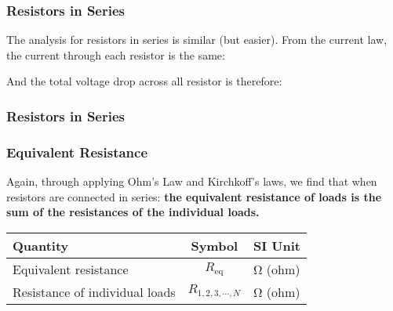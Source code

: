\documentclass[12pt,aspectratio=169]{beamer}
\newcommand{\eq}[2]{\vspace{#1}{\Large\begin{displaymath}#2\end{displaymath}}}
\begin{document}
\begin{frame}
  \frametitle{Resistors in Series}
  \begin{center}
  \end{center}

  \vspace{.1in}The analysis for resistors in series is similar (but easier).
  From the current law, the current through each resistor is the same:

  \eq{-.2in}{I_1=I_2=I_3=\cdots=I}

  \vspace{-.15in}And the total voltage drop across all resistor is therefore:

  \eq{-.4in}{V=V_1+V_2+V_3+\cdot=I(R_1+R_2+R_3+\cdots)}
\end{frame}

\begin{frame}
  \frametitle{Resistors in Series}
  \frametitle{Equivalent Resistance}
  Again, through applying Ohm's Law and Kirchkoff's laws, we find that when
  resistors are connected in series: \textbf{the equivalent resistance of loads
    is the sum of the resistances of the individual loads.}

  \eq{-.2in}{
    \boxed{R_\mathrm{eq}=R_1 + R_2 + \cdots + R_N}
  }
  \begin{center}
    \begin{tabular}{l|c|l}
      \rowcolor{pink}
      \textbf{Quantity} & \textbf{Symbol} & \textbf{SI Unit} \\ \hline
      Equivalent resistance          & $R_\mathrm{eq}$ & \si{\ohm} (ohm) \\
      Resistance of individual loads & $R_{1,2,3,\cdots,N}$ & \si{\ohm} (ohm) \\
    \end{tabular}
  \end{center}
\end{frame}
\end{document}
